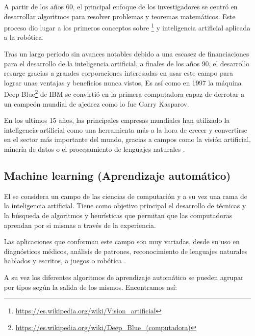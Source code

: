 A partir de los años 60, el principal enfoque de los investigadores se centró en desarrollar algoritmos para resolver problemas y teoremas matemáticos. Este proceso dio lugar a los primeros conceptos sobre \footnote{\url{https://es.wikipedia.org/wiki/Vision\_artificial}} y inteligencia artificial aplicada a la robótica.

Tras un largo periodo sin avances notables debido a una escasez de financiaciones para el desarrollo de la inteligencia artificial, a finales de los años 90, el desarrollo resurge gracias a grandes corporaciones interesadas en usar este campo para lograr unas ventajas y beneficios nunca vistos, Es así como en 1997 la máquina Deep Blue\footnote{\url{https://es.wikipedia.org/wiki/Deep_Blue_(computadora)}} de IBM se convirtió en la primera computadora capaz de derrotar a un campeón mundial de ajedrez como lo fue Garry Kasparov.

En los ultimos 15 años, las principales empresas mundiales han utilizado la inteligencia artificial como una herramienta más a la hora de crecer y convertirse en el sector más importante del mundo, gracias a campos como la visión artificial, minería de datos o el procesamiento de lenguajes naturales \cite{aihistory}.

\subsection{Machine learning (Aprendizaje automático)}
El  se considera un campo de las ciencias de computación y a su vez una rama de la inteligencia artificial. Tiene como objetivo principal el desarrollo de técnicas y la búsqueda de algoritmos y heurísticas que permitan que las computadoras aprendan por si mismas a través de la experiencia.

Las aplicaciones que conforman este campo son muy variadas, desde su uso en diagnósticos médicos, análisis de patrones, reconocimiento de lenguajes naturales hablados y escritos, a juegos o robótica \cite{wiki:apredizaje_automatico}.

A su vez los diferentes algoritmos de aprendizaje automático se pueden agrupar por tipos según la salida de los mismos.
Encontramos así:

